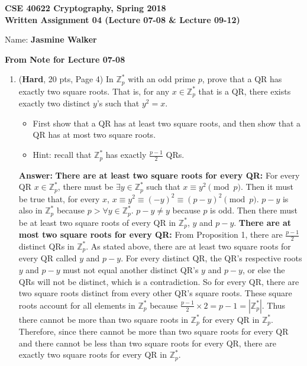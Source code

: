\documentclass[10pt]{article}
\begin{document}






\begin{center}
	\textbf{CSE 40622 Cryptography, Spring 2018\\Written Assignment 04 (Lecture 07-08 \& Lecture 09-12)}
\end{center}


Name: \textbf{Jasmine Walker}




\bigskip\textbf{From Note for Lecture 07-08}

\begin{enumerate}
	
	
	\item (\textbf{Hard}, 20 pts, Page 4) In $\mathbb{Z}_p^*$ with an odd prime $p$, prove that a QR has exactly two square roots. That is, for any $x\in\mathbb{Z}_p^*$ that is a QR, there exists exactly two distinct $y$'s such that $y^2=x$.
	\begin{itemize}
		\item First show that a QR has at least two square roots, and then show that a QR has at most two square roots.
        \item Hint: recall that $\mathbb{Z}_p^*$ has exactly $\frac{p-1}{2}$ QRs. 
	\end{itemize}

	\textbf{Answer:} \newline \textbf{There are at least two square roots for every QR:} \newline For every QR $x\in\mathbb{Z}_p^*$, there must be $\exists y\in\mathbb{Z}_p^*$ such that $x\equiv y^{2}\pmod p$. Then it must be true that, for every $x$, $x\equiv y^{2}\equiv (-y)^{2}\equiv (p-y)^{2}\pmod p$. $p-y$ is also in $\mathbb{Z}_p^*$ because $p> \forall y\in \mathbb{Z}_p^*$. $p-y\not=y$ because $p$ is odd. Then there must be at least two square roots of every QR in $\mathbb{Z}_p^*$, $y$ and $p-y$. \newline \newline \textbf{There are at most two square roots for every QR:} \newline From Proposition 1, there are $\frac{p-1}{2}$ distinct QRs in $\mathbb{Z}_p^*$. As stated above, there are at least two square roots for every QR called $y$ and $p-y$. For every distinct QR, the QR's respective roots $y$ and $p-y$ must not equal another distinct QR's $y$ and $p-y$, or else the QRs will not be distinct, which is a contradiction. So for every QR, there are two square roots distinct from every other QR's square roots. These square roots account for all elements in $\mathbb{Z}_p^*$ because $\frac{p-1}{2}\times 2 = p-1 = |\mathbb{Z}_p^*|$. Thus there cannot be more than two square roots in $\mathbb{Z}_p^*$ for every QR in $\mathbb{Z}_p^*$. \newline \newline Therefore, since there cannot be more than two square roots for every QR and there cannot be less than two square roots for every QR, there are exactly two square roots for every QR in $\mathbb{Z}_p^*$.
	

\end{enumerate}
\end{document}
